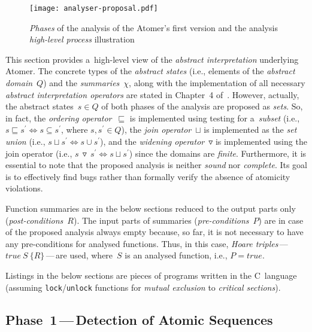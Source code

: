 \begin{figure}[hbt]
    \centering
    \texttt{[image: analyser-proposal.pdf]}
    \caption{\emph{Phases} of the analysis of the Atomer's first version and the analysis \emph{high-level process} illustration~\cite{harmimBP}}
    \label{fig:atomerPhasesSequences}
\end{figure}

This section provides a~high-level view of the \emph{abstract interpretation} underlying Atomer. The concrete types of the \emph{abstract states} (i.e., elements of the \emph{abstract domain}~$ Q $) and the \emph{summaries}~$ \chi $, along with the implementation of all necessary \emph{abstract interpretation operators} are stated in Chapter~4 of~\cite{harmimBP}. However, actually, the abstract states~$ s \in Q $ of both phases of the analysis are proposed as \emph{sets}. So, in fact, the \emph{ordering operator}~$ \sqsubseteq $ is implemented using testing for a~\emph{subset} (i.e., $ s \sqsubseteq s^\prime \Longleftrightarrow s \subseteq s^\prime $, where $ s, s^\prime \in Q $), the \emph{join operator}~$ \sqcup $ is implemented as the \emph{set union} (i.e., $ s \sqcup s^\prime \Longleftrightarrow s \cup s^\prime $), and the \emph{widening operator}~$ \triangledown $ is implemented using the join operator (i.e., $ s\,\triangledown\,s^\prime \Longleftrightarrow s \sqcup s^\prime $) since the domains are \emph{finite}. Furthermore, it is essential to note that the proposed analysis is neither \emph{sound} nor \emph{complete}. Its goal is to effectively find bugs rather than formally verify the absence of atomicity violations.

Function summaries are in the below sections reduced to the output parts only (\emph{post-conditions}~$ R $). The input parts of summaries (\emph{pre-conditions}~$ P $) are in case of the proposed analysis always empty because, so far, it is not necessary to have any pre-conditions for analysed functions. Thus, in this case, \emph{Hoare triples}\,---\,$ true\ S\ \{R\} $\,---\,are used, where~$ S $ is an analysed function, i.e., $ P = true $.

Listings in the below sections are pieces of programs written in the C~language (assuming \texttt{lock}/\texttt{unlock} functions for \emph{mutual exclusion} to \emph{critical sections}).

\subsection{Phase~1\,---\,Detection of Atomic Sequences}

